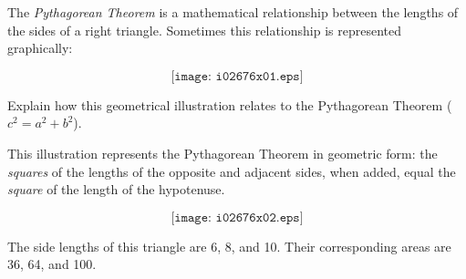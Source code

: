 

The {\it Pythagorean Theorem} is a mathematical relationship between the lengths of the sides of a right triangle.  Sometimes this relationship is represented graphically:

$$\texttt{[image: i02676x01.eps]}$$

Explain how this geometrical illustration relates to the Pythagorean Theorem ($c^2 = a^2 + b^2$).







This illustration represents the Pythagorean Theorem in geometric form: the {\it squares} of the lengths of the opposite and adjacent sides, when added, equal the {\it square} of the length of the hypotenuse.

$$\texttt{[image: i02676x02.eps]}$$

The side lengths of this triangle are 6, 8, and 10.  Their corresponding areas are 36, 64, and 100.











